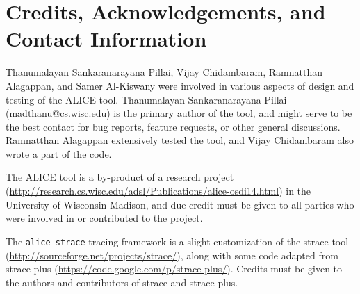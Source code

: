 \documentclass[oneside]{memoir}
\begin{document}
\chapter{Credits, Acknowledgements, and Contact Information}


Thanumalayan Sankaranarayana Pillai, Vijay Chidambaram, Ramnatthan Alagappan, and Samer Al-Kiswany were involved in various aspects of design and testing of the ALICE tool. Thanumalayan Sankaranarayana Pillai (madthanu@cs.wisc.edu) is the primary author of the tool, and might serve to be the best contact for bug reports, feature requests, or other general discussions. Ramnatthan Alagappan extensively tested the tool, and Vijay Chidambaram also wrote a part of the code.

The ALICE tool is a by-product of a research project (\url{http://research.cs.wisc.edu/adsl/Publications/alice-osdi14.html}) in the University of Wisconsin-Madison, and due credit must be given to all parties who were involved in or contributed to the project.

The \verb;alice-strace; tracing framework is a slight customization of the strace tool (\url{http://sourceforge.net/projects/strace/}), along with some code adapted from strace-plus (\url{https://code.google.com/p/strace-plus/}). Credits must be given to the authors and contributors of strace and strace-plus.
\end{document}
